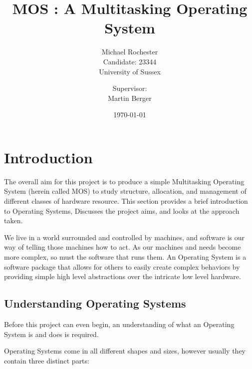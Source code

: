 \documentclass[a4paper]{report}
\title{MOS : A Multitasking Operating System}
\date{\today}
\author{Michael Rochester\\ Candidate: 23344\\ University of Sussex
        \and Supervisor:\\ Martin Berger}
\begin{document}
\titlespacing*{\chapter}{0pt}{-50pt}{20pt}
\titleformat{\chapter}[display]{\normalfont\huge\bfseries}{\chaptertitlename\ \thechapter}{20pt}{\Huge}


\maketitle

\tableofcontents
\listoffigures

\chapter{Introduction}

The overall aim for this project is to produce a simple Multitasking Operating System (herein called MOS) to study structure, allocation, and management of different classes of hardware resource. This section provides a brief introduction to Operating Systems, Discusses the project aims, and looks at the approach taken.

We live in a world surrounded and controlled by machines, and software is our way of telling those machines how to act. As our machines and needs become more complex, so must the software that runs them. An Operating System is a software package that allows for others to easily create complex behaviors by providing simple high level abstractions over the intricate low level hardware.

















\clearpage
\section{Understanding Operating Systems}


Before this project can even begin, an understanding of what an Operating System is and does is required.

Operating Systems come in all different shapes and sizes, however usually they contain three distinct parts:
\end{document}
